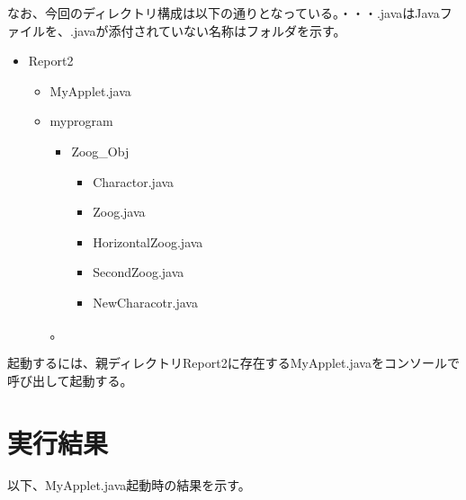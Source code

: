 \documentclass[dvipdfmx]{jsarticle}
\begin{document}
なお、今回のディレクトリ構成は以下の通りとなっている。・・・.javaはJavaファイルを、.javaが添付されていない名称はフォルダを示す。
\begin{itemize}
  \item Report2
  \begin{itemize}
    \item MyApplet.java
    \item myprogram
    \begin{itemize}
      \item Zoog\_Obj
      \begin{itemize}
        \item Charactor.java
        \item Zoog.java
        \item HorizontalZoog.java
        \item SecondZoog.java
        \item NewCharacotr.java
      \end{itemize}
    \end{itemize}。
  \end{itemize}
\end{itemize}
起動するには、親ディレクトリReport2に存在するMyApplet.javaをコンソールで呼び出して起動する。
\section{実行結果}
以下、MyApplet.java起動時の結果を示す。
\end{document}
